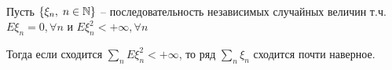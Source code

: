 \begin{theorem}~

  Пусть $\{ \xi_n,\; n \in \mathbb{N} \}$ -- последовательность независимых случайных величин т.ч. 
  $E \xi_n = 0, \forall n$  и $E \xi_n^2 < +\infty, \forall n$

  Тогда если сходится $\sum\limits_n E\xi_n^2 < +\infty$, 
  то ряд $\sum\limits_n \xi_n$ сходится почти наверное.

\end{theorem}

